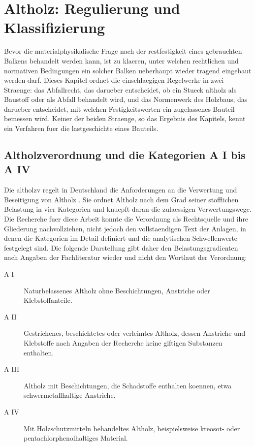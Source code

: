 \chapter{Altholz: Regulierung und Klassifizierung}
\label{ch:background}

Bevor die materialphysikalische Frage nach der \gls{restfestigkeit} eines
gebrauchten Balkens behandelt werden kann, ist zu klaeren, unter welchen
rechtlichen und normativen Bedingungen ein solcher Balken ueberhaupt wieder
tragend eingebaut werden darf. Dieses Kapitel ordnet die einschlaegigen
Regelwerke in zwei Straenge: das Abfallrecht, das darueber entscheidet, ob ein
Stueck \gls{altholz} als Baustoff oder als Abfall behandelt wird, und das
Normenwerk des Holzbaus, das darueber entscheidet, mit welchen
Festigkeitswerten ein zugelassenes Bauteil bemessen wird. Keiner der beiden
Straenge, so das Ergebnis des Kapitels, kennt ein Verfahren fuer die
\gls{lastgeschichte} eines Bauteils.

\section{Altholzverordnung und die Kategorien A I bis A IV}
\label{sec:altholzv}

Die \acrfull{altholzv} regelt in Deutschland die Anforderungen an die
Verwertung und Beseitigung von Altholz \parencite{altholzv}. Sie ordnet
Altholz nach dem Grad seiner stofflichen Belastung in vier Kategorien und
knuepft daran die zulaessigen Verwertungswege. Die Recherche fuer diese
Arbeit konnte die Verordnung als Rechtsquelle und ihre Gliederung
nachvollziehen, nicht jedoch den vollstaendigen Text der Anlagen, in denen die
Kategorien im Detail definiert und die analytischen Schwellenwerte festgelegt
sind. Die folgende Darstellung gibt daher den Belastungsgradienten nach Angaben
der Fachliteratur wieder und nicht den Wortlaut der Verordnung:

\begin{description}
  \item[A I] Naturbelassenes Altholz ohne Beschichtungen, Anstriche oder
    Klebstoffanteile.
  \item[A II] Gestrichenes, beschichtetes oder verleimtes Altholz, dessen
    Anstriche und Klebstoffe nach Angaben der Recherche keine giftigen
    Substanzen enthalten.
  \item[A III] Altholz mit Beschichtungen, die Schadstoffe enthalten koennen,
    etwa schwermetallhaltige Anstriche.
  \item[A IV] Mit Holzschutzmitteln behandeltes Altholz, beispielsweise
    kreosot- oder pentachlorphenolhaltiges Material.
\end{description}

